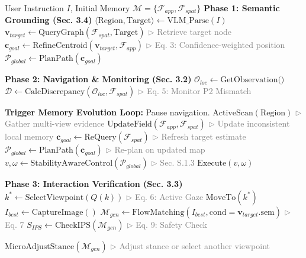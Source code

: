 \documentclass[conference]{IEEEtran}
\newcommand{\COMMENT}[1]{\hfill \textcolor{gray}{$\triangleright$ #1}}
\begin{document}
\begin{algorithm}[h]
\caption{Multi-modal Interactive Field (MIF) execution loop}
\label{alg:main_loop}
\begin{algorithmic}[1]
\REQUIRE User Instruction $I$, Initial Memory $\mathcal{M} = \{\mathcal{F}_{app}, \mathcal{F}_{spat}\}$
\STATE \textbf{Phase 1: Semantic Grounding (Sec. 3.4)}
\STATE $\langle \text{Region}, \text{Target} \rangle \leftarrow \text{VLM\_Parse}(I)$
\STATE $\mathbf{v}_{target} \leftarrow \text{QueryGraph}(\mathcal{F}_{spat}, \text{Target})$ \COMMENT{Retrieve target node}
\STATE $\mathbf{c}_{goal} \leftarrow \text{RefineCentroid}(\mathbf{v}_{target}, \mathcal{F}_{app})$ \COMMENT{Eq. 3: Confidence-weighted position}
\STATE $\mathcal{P}_{global} \leftarrow \text{PlanPath}(\mathbf{c}_{goal})$

\STATE \textbf{Phase 2: Navigation \& Monitoring (Sec. 3.2)}
    \STATE $\mathcal{O}_{loc} \leftarrow \text{GetObservation()}$
    \STATE $\mathcal{D} \leftarrow \text{CalcDiscrepancy}(\mathcal{O}_{loc}, \mathcal{F}_{spat})$ \COMMENT{Eq. 5: Monitor P2 Mismatch}
    
        \STATE \textbf{Trigger Memory Evolution Loop:}
        \STATE Pause navigation.
        \STATE $\text{ActiveScan}(\text{Region})$ \COMMENT{Gather multi-view evidence}
        \STATE $\text{UpdateField}(\mathcal{F}_{app}, \mathcal{F}_{spat})$ \COMMENT{Update inconsistent local memory}
        \STATE $\mathbf{c}_{goal} \leftarrow \text{ReQuery}(\mathcal{F}_{spat})$ \COMMENT{Refresh target estimate}
        \STATE $\mathcal{P}_{global} \leftarrow \text{PlanPath}(\mathbf{c}_{goal})$ \COMMENT{Re-plan on updated map}
    \ELSE
        \STATE $v, \omega \leftarrow \text{StabilityAwareControl}(\mathcal{P}_{global})$ \COMMENT{Sec. S.1.3}
        \STATE $\text{Execute}(v, \omega)$
    \ENDIF
\ENDWHILE

\STATE \textbf{Phase 3: Interaction Verification (Sec. 3.3)}
    \STATE $k^* \leftarrow \text{SelectViewpoint}(Q(k))$ \COMMENT{Eq. 6: Active Gaze}
    \STATE $\text{MoveTo}(k^*)$
    \STATE $I_{best} \leftarrow \text{CaptureImage}()$
    \STATE $\mathcal{M}_{gen} \leftarrow \text{FlowMatching}(I_{best}, \text{cond}=\mathbf{v}_{target}.\text{sem})$ \COMMENT{Eq. 7}
    \STATE $S_{IPS} \leftarrow \text{CheckIPS}(\mathcal{M}_{gen})$ \COMMENT{Eq. 9: Safety Check}
    
        \STATE $\text{MicroAdjustStance}(\mathcal{M}_{gen})$ \COMMENT{Adjust stance or select another viewpoint}
    \ENDIF
\ENDWHILE

\RETURN {}
\end{algorithmic}
\end{algorithm}
\end{document}
